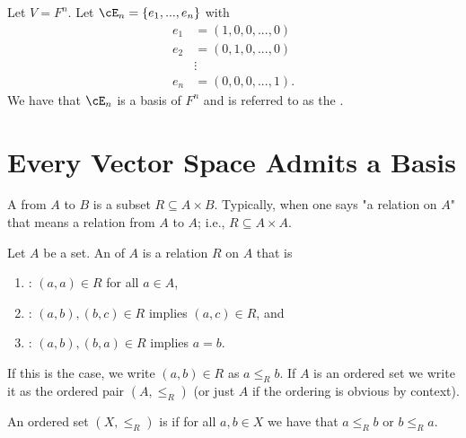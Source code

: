     \begin{example}
        Let $V = F^n$. Let $\cE_n = \{e_1,...,e_n\}$ with
            \begin{equation*}
            \begin{split}
                e_1 &= (1,0,0,...,0) \\
                e_2 &= (0,1,0,...,0) \\
                &\vdots \\
                e_n &= (0,0,0,...,1).
            \end{split}
            \end{equation*}
        We have that $\cE_n$ is a basis of $F^n$ and is referred to as the .
    \end{example}

\section{Every Vector Space Admits a Basis}\label{section:vector-bases}
    \begin{definition}
        A  from $A$ to $B$ is a subset $R \subseteq A \times B$. Typically, when one says "a relation on $A$" that means a relation from $A$ to $A$; i.e., $R \subseteq A \times A$.
    \end{definition}

    \begin{definition}
        Let $A$ be a set. An  of $A$ is a relation $R$ on $A$ that is 
            \begin{enumerate}[label = (\arabic*)]
                \item {}: $(a,a) \in R$ for all $a \in A$,
                \item {}: $(a,b),(b,c) \in R$ implies $(a,c) \in R$, and 
                \item {}: $(a,b),(b,a) \in R$ implies $a = b$.
            \end{enumerate}
        If this is the case, we write $(a,b) \in R$ as $a \leq_R b$. If $A$ is an ordered set we write it as the ordered pair $(A,\leq_R)$ (or just $A$ if the ordering is obvious by context).
    \end{definition}

    \begin{definition}
        An ordered set $(X, \leq_R)$ is  if for all $a,b \in X$ we have that $a \leq_R b$ or $b \leq_R a$.
    \end{definition}

